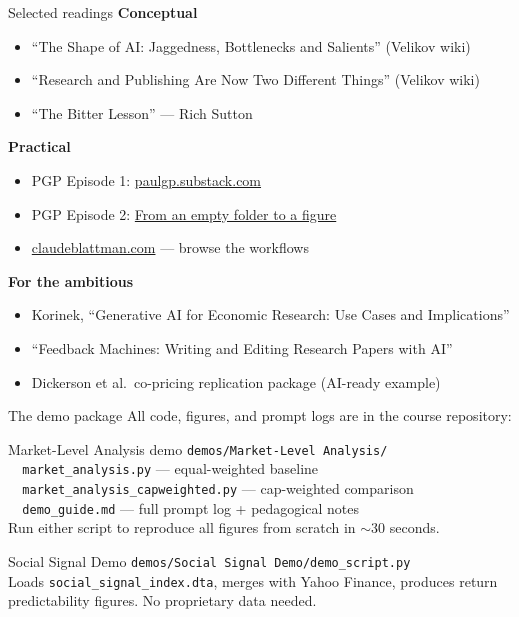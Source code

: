 \documentclass[aspectratio=169, 10pt]{beamer}
\begin{document}
\appendix

\begin{frame}{Selected readings}
  \textbf{Conceptual}
  \begin{itemize}
    \small
    \item ``The Shape of AI: Jaggedness, Bottlenecks and Salients'' (Velikov wiki)
    \item ``Research and Publishing Are Now Two Different Things'' (Velikov wiki)
    \item ``The Bitter Lesson'' --- Rich Sutton
  \end{itemize}
  \vspace{0.4em}
  \textbf{Practical}
  \begin{itemize}
    \small
    \item PGP Episode 1: \href{https://paulgp.substack.com/p/getting-started-with-claude-code}{paulgp.substack.com}
    \item PGP Episode 2: \href{https://paulgp.substack.com/p/from-an-empty-folder-to-a-figure}{From an empty folder to a figure}
    \item \href{https://claudeblattman.com}{claudeblattman.com} --- browse the workflows
  \end{itemize}
  \vspace{0.4em}
  \textbf{For the ambitious}
  \begin{itemize}
    \small
    \item Korinek, ``Generative AI for Economic Research: Use Cases and Implications''
    \item ``Feedback Machines: Writing and Editing Research Papers with AI''
    \item Dickerson et al.\ co-pricing replication package (AI-ready example)
  \end{itemize}
\end{frame}

\begin{frame}{The demo package}
  All code, figures, and prompt logs are in the course repository:
  \vspace{0.5em}
  \begin{block}{Market-Level Analysis demo}
    \small
    \texttt{demos/Market-Level Analysis/}\\[0.2em]
    \texttt{\ \ market\_analysis.py} --- equal-weighted baseline\\
    \texttt{\ \ market\_analysis\_capweighted.py} --- cap-weighted comparison\\
    \texttt{\ \ demo\_guide.md} --- full prompt log + pedagogical notes\\[0.3em]
    Run either script to reproduce all figures from scratch in $\sim$30 seconds.
  \end{block}
  \vspace{0.4em}
  \begin{block}{Social Signal Demo}
    \small
    \texttt{demos/Social Signal Demo/demo\_script.py}\\[0.2em]
    Loads \texttt{social\_signal\_index.dta}, merges with Yahoo Finance,
    produces return predictability figures. No proprietary data needed.
  \end{block}
\end{frame}
\end{document}
